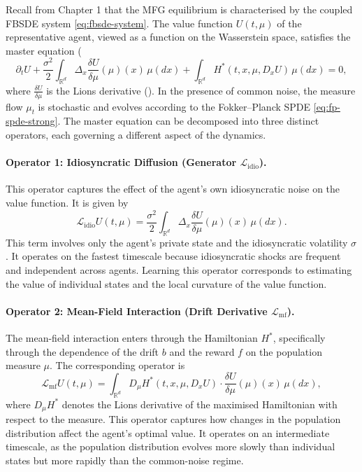 Recall from Chapter 1 that the MFG equilibrium is characterised by the coupled FBSDE
system \eqref{eq:fbsde-system}. The value function $U(t,\mu)$ of the representative
agent, viewed as a function on the Wasserstein space, satisfies the master equation
(\citep{carmonadelaruelachapelle2014}
\[
    \partial_t U + \frac{\sigma^2}{2} \int_{\mathbb{R}^d} \Delta_x \frac{\delta
    U}{\delta\mu}(\mu)(x)\, \mu(dx) + \int_{\mathbb{R}^d} H^*(t,x,\mu,D_x U)\,
    \mu(dx) = 0,
\]
where $\frac{\delta U}{\delta\mu}$ is the Lions derivative ().
In the presence of common noise, the measure flow $\mu_t$ is stochastic and evolves
according to the Fokker--Planck SPDE \eqref{eq:fp-spde-strong}. The master equation
can be decomposed into three distinct operators, each governing a different aspect of
the dynamics.

\paragraph{Operator 1: Idiosyncratic Diffusion (Generator $\mathcal{L}_{\mathrm{idio}}$).}
This operator captures the effect of the agent's own idiosyncratic noise on the value
function. It is given by
\begin{equation}
    \mathcal{L}_{\mathrm{idio}} U(t,\mu) = \frac{\sigma^2}{2} \int_{\mathbb{R}^d}
    \Delta_x \frac{\delta U}{\delta\mu}(\mu)(x)\, \mu(dx).
    \label{eq:operator-idio}
\end{equation}
This term involves only the agent's private state and the idiosyncratic volatility
$\sigma$. It operates on the fastest timescale because idiosyncratic shocks are
frequent and independent across agents. Learning this operator corresponds to
estimating the value of individual states and the local curvature of the value
function.

\paragraph{Operator 2: Mean-Field Interaction (Drift Derivative $\mathcal{L}_{\mathrm{mf}}$).}
The mean-field interaction enters through the Hamiltonian $H^*$, specifically through
the dependence of the drift $b$ and the reward $f$ on the population measure $\mu$.
The corresponding operator is
\begin{equation}
    \mathcal{L}_{\mathrm{mf}} U(t,\mu) = \int_{\mathbb{R}^d} D_\mu H^*(t,x,\mu,D_x U)
    \cdot \frac{\delta U}{\delta\mu}(\mu)(x)\, \mu(dx),
    \label{eq:operator-mf}
\end{equation}
where $D_\mu H^*$ denotes the Lions derivative of the maximised Hamiltonian with
respect to the measure. This operator captures how changes in the population
distribution affect the agent's optimal value. It operates on an intermediate
timescale, as the population distribution evolves more slowly than individual states
but more rapidly than the common-noise regime.

